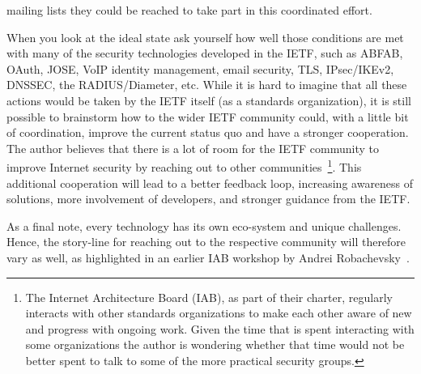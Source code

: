 \documentclass[peerreview, a4paper, 7pt]{IEEEtran}
\begin{document}
mailing lists they could be reached to take part in this coordinated effort. 

When you look at the ideal state ask yourself how well those conditions are met with many of the security technologies developed in the IETF, such as ABFAB, OAuth, JOSE, VoIP identity management, email security, TLS, IPsec/IKEv2, DNSSEC, the RADIUS/Diameter, etc. While it is hard to imagine that all these actions would be taken by the IETF itself (as a standards organization), it is still possible to brainstorm how to the wider IETF community could, with a little bit of coordination, improve the current status quo and have a stronger cooperation. The author believes that there is a lot of room for the IETF community to improve Internet security by reaching out to other communities~\footnote{The Internet Architecture Board (IAB), as part of their charter, regularly interacts with other standards organizations to make each other aware of new and progress with ongoing work. Given the time that is spent interacting with some organizations the author is wondering whether that time would not be better spent to talk to some of the more practical security groups.}. This additional cooperation will lead to a better feedback loop, increasing awareness of solutions, more involvement of developers, and stronger guidance from the IETF. 

As a final note, every technology has its own eco-system and unique challenges. Hence, the story-line for reaching out to the respective community will therefore vary as well, as highlighted in an earlier IAB workshop by Andrei Robachevsky~\cite{Robachevsky}. 
%

% 

\end{document}
